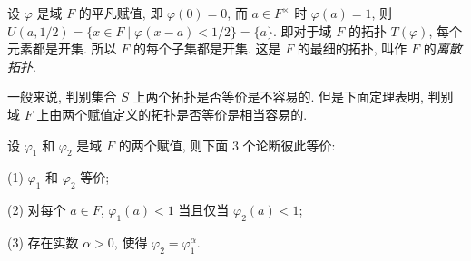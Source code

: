 \begin{example}
设 $\varphi$ 是域 $F$ 的平凡赋值, 即 $\varphi(0)=0$, 而 $a\in F^{\times}$ 时 $\varphi(a)=1$, 则 $U(a,1/2)=\{x\in F\mid\varphi(x-a)<1/2\}=\{a\}$. 即对于域 $F$ 的拓扑 $T(\varphi)$, 每个元素都是开集. 所以 $F$ 的每个子集都是开集. 这是 $F$ 的最细的拓扑, 叫作 $F$ 的\emph{离散拓扑}.
\end{example}

一般来说, 判别集合 $S$ 上两个拓扑是否等价是不容易的. 但是下面定理表明, 判别域 $F$ 上由两个赋值定义的拓扑是否等价是相当容易的.

\begin{theorem}\label{thm:7.1}
设 $\varphi_1$ 和 $\varphi_2$ 是域 $F$ 的两个赋值, 则下面 $3$ 个论断彼此等价:

(1) $\varphi_1$ 和 $\varphi_2$ 等价;

(2) 对每个 $a\in F$, $\varphi_1(a)<1$ 当且仅当 $\varphi_2(a)<1$;

(3) 存在实数 $\alpha>0$, 使得 $\varphi_2=\varphi_1^{\alpha}$.
\end{theorem}


